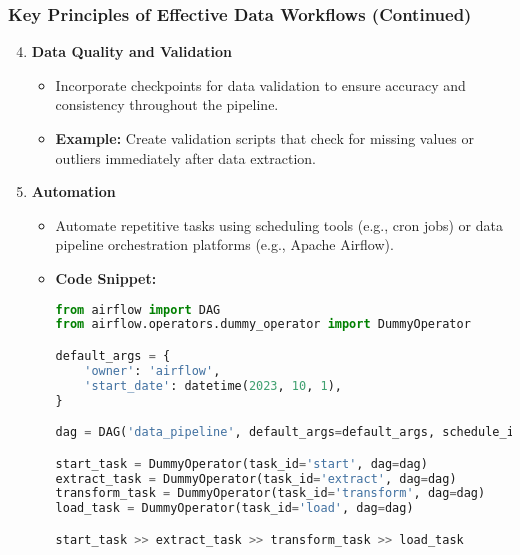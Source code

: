 \documentclass[aspectratio=169]{beamer}
\begin{document}
\begin{frame}
    \frametitle{Key Principles of Effective Data Workflows (Continued)}
    \begin{enumerate}
        \setcounter{enumi}{3} %
        \item \textbf{Data Quality and Validation}
        \begin{itemize}
            \item Incorporate checkpoints for data validation to ensure accuracy and consistency throughout the pipeline.
            \item \textbf{Example:} Create validation scripts that check for missing values or outliers immediately after data extraction.
        \end{itemize}
        
        \item \textbf{Automation}
        \begin{itemize}
            \item Automate repetitive tasks using scheduling tools (e.g., cron jobs) or data pipeline orchestration platforms (e.g., Apache Airflow).
            \item \textbf{Code Snippet:}
            \begin{lstlisting}[language=Python]
from airflow import DAG
from airflow.operators.dummy_operator import DummyOperator

default_args = {
    'owner': 'airflow',
    'start_date': datetime(2023, 10, 1),
}

dag = DAG('data_pipeline', default_args=default_args, schedule_interval='@daily')

start_task = DummyOperator(task_id='start', dag=dag)
extract_task = DummyOperator(task_id='extract', dag=dag)
transform_task = DummyOperator(task_id='transform', dag=dag)
load_task = DummyOperator(task_id='load', dag=dag)

start_task >> extract_task >> transform_task >> load_task
            \end{lstlisting}
        \end{itemize}
    \end{enumerate}
\end{frame}
\end{document}
